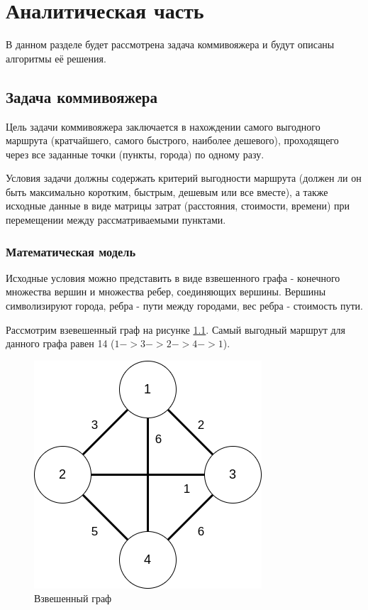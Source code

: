 \chapter{Аналитическая часть}

В данном разделе будет рассмотрена задача коммивояжера и будут описаны алгоритмы её решения.

\section{Задача коммивояжера}

Цель задачи коммивояжера \cite{model} заключается в нахождении самого выгодного маршрута (кратчайшего, самого быстрого, наиболее дешевого), проходящего через все заданные точки (пункты, города) по одному разу.

Условия задачи должны содержать критерий выгодности маршрута (должен ли он быть максимально коротким, быстрым, дешевым или все вместе), а также исходные данные в виде матрицы затрат (расстояния, стоимости, времени) при перемещении между рассматриваемыми пунктами.

\subsection{Математическая модель}

Исходные условия можно представить в виде взвешенного графа - конечного множества вершин и множества ребер, соединяющих вершины. Вершины символизируют города, ребра - пути между городами, вес ребра - стоимость пути.

Рассмотрим взевешенный граф на рисунке \ref{img:graph}. Самый выгодный маршрут для данного графа равен 14 ($1 -> 3 -> 2 -> 4 -> 1$).

\begin{figure}[H]
	\begin{center}
		\includegraphics[scale=0.6]{img/graph.png}
	\end{center}
	\captionsetup{justification=centering}
	\caption{Взвешенный граф}
	\label{img:graph}
\end{figure}

